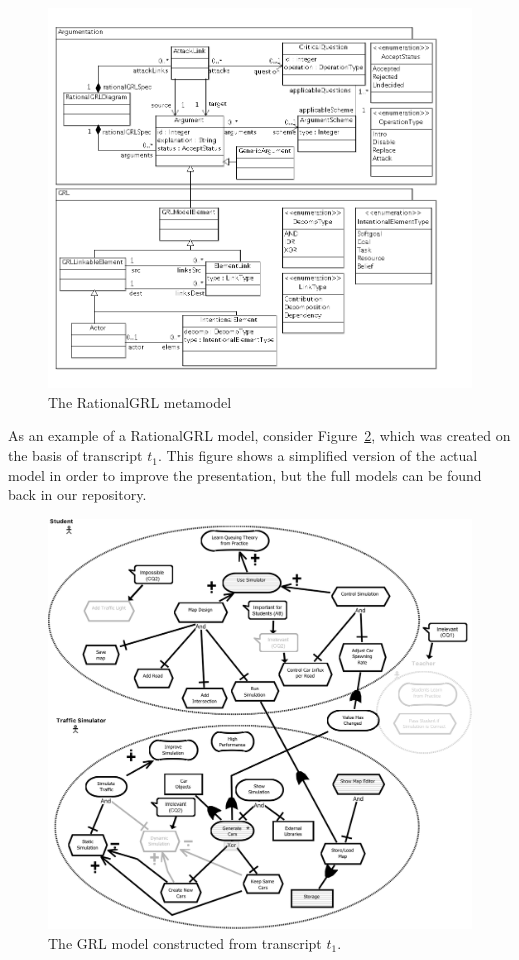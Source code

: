 \begin{figure}[h!]
\includegraphics[width=\textwidth]{metamodel/metamodel}
\caption{The RationalGRL metamodel }
\label{fig:metamodel}
\end{figure}

As an example of a RationalGRL model, consider Figure~\ref{fig:transcripts:grl}, which was created on the basis of transcript $t_1$. This figure shows a simplified version of the actual model in order to improve the presentation, but the full models can be found back in our repository. 

\begin{figure}[h!]
\includegraphics[width=\textwidth]{img/Fig6}
\caption{The GRL model constructed from transcript $t_1$.} 
\label{fig:transcripts:grl}
\end{figure} 

